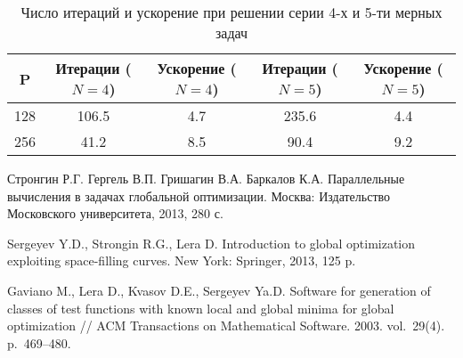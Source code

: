 \documentclass[11pt, oneside, a4paper]{article}
\begin{document}
\begin{table}[!hbp]
    \centering
    \caption{Число итераций и ускорение при решении серии 4-х и 5-ти мерных задач}
    \begin{tabular}{|c|c|c|c|c|}
    \hline
    P    & Итерации ($N=4$) & Ускорение ($N=4$) &         Итерации ($N=5$) & Ускорение ($N=5$) \\ \hline
	128 & 106.5   & 4.7      &         235.6   & 4.4      \\ \hline
	256 & 41.2    & 8.5      &         90.4    & 9.2      \\ \hline
	\end{tabular}
    
    \label{table:GKLS_RES}
\end{table}



\begin{biblio}

Стронгин Р.Г. Гергель В.П. Гришагин В.А. Баркалов К.А. Параллельные вычисления
в задачах глобальной оптимизации.
Москва: Издательство Московского университета,
2013, 280 с.

Sergeyev Y.D., Strongin R.G., Lera D. Introduction to global optimization exploiting space-filling curves. 
New York: Springer, 2013, 125 p.


Gaviano M., Lera D., Kvasov D.E., Sergeyev Ya.D. Software for generation of classes of test functions with known local and global minima for global optimization // ACM Transactions on Mathematical Software. 2003. vol.~29(4). p.~469--480.



\end{biblio}
\end{document}
